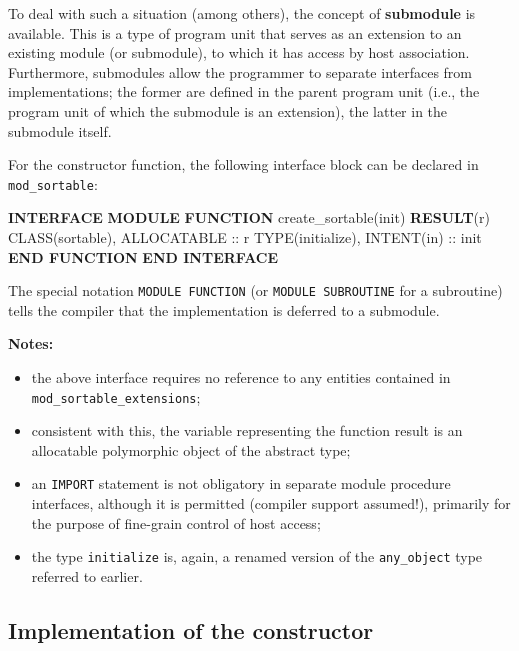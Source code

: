 \documentclass[
]{article}
\newenvironment{Shaded}{}{}
\newcommand{\DataTypeTok}[1]{\textcolor[rgb]{0.56,0.13,0.00}{#1}}
\newcommand{\KeywordTok}[1]{\textcolor[rgb]{0.00,0.44,0.13}{\textbf{#1}}}
\newcommand{\NormalTok}[1]{#1}
\providecommand{\tightlist}{%
  \setlength{\itemsep}{0pt}\setlength{\parskip}{0pt}}
\begin{document}
To deal with such a situation (among others), the concept of
\textbf{submodule} is available. This is a type of program unit that
serves as an extension to an existing module (or submodule), to which it
has access by host association. Furthermore, submodules allow the
programmer to separate interfaces from implementations; the former are
defined in the parent program unit (i.e., the program unit of which the
submodule is an extension), the latter in the submodule itself.

For the constructor function, the following interface block can be
declared in \texttt{mod\_sortable}:

\begin{Shaded}
\begin{Highlighting}[]
\KeywordTok{INTERFACE}
   \KeywordTok{MODULE} \KeywordTok{FUNCTION}\NormalTok{ create\_sortable(init) }\KeywordTok{RESULT}\NormalTok{(r)}
      \DataTypeTok{CLASS(sortable)}\NormalTok{, }\DataTypeTok{ALLOCATABLE} \DataTypeTok{::}\NormalTok{ r}
      \DataTypeTok{TYPE(initialize)}\NormalTok{, }\DataTypeTok{INTENT(in)} \DataTypeTok{::}\NormalTok{ init}
   \KeywordTok{END FUNCTION}
\KeywordTok{END INTERFACE}
\end{Highlighting}
\end{Shaded}

The special notation \texttt{MODULE\ FUNCTION} (or
\texttt{MODULE\ SUBROUTINE} for a subroutine) tells the compiler that
the implementation is deferred to a submodule.

\textbf{Notes:}

\begin{itemize}
\tightlist
\item
  the above interface requires no reference to any entities contained in
  \texttt{mod\_sortable\_extensions};
\item
  consistent with this, the variable representing the function result is
  an allocatable polymorphic object of the abstract type;
\item
  an \texttt{IMPORT} statement is not obligatory in separate module
  procedure interfaces, although it is permitted (compiler support
  assumed!), primarily for the purpose of fine-grain control of host
  access;
\item
  the type \texttt{initialize} is, again, a renamed version of the
  \texttt{any\_object} type referred to earlier.
\end{itemize}

\subsection{Implementation of the
constructor}\label{implementation-of-the-constructor}
\end{document}
